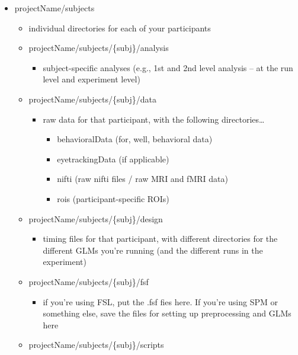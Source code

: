 \documentclass[]{book}
\providecommand{\tightlist}{%
  \setlength{\itemsep}{0pt}\setlength{\parskip}{0pt}}
\begin{document}
\begin{itemize}
\tightlist
\item
  projectName/subjects

  \begin{itemize}
  \tightlist
  \item
    individual directories for each of your participants
  \item
    projectName/subjects/\{subj\}/analysis

    \begin{itemize}
    \tightlist
    \item
      subject-specific analyses (e.g., 1st and 2nd level analysis -- at the run level and experiment level)
    \end{itemize}
  \item
    projectName/subjects/\{subj\}/data

    \begin{itemize}
    \tightlist
    \item
      raw data for that participant, with the following directories\ldots{}

      \begin{itemize}
      \tightlist
      \item
        behavioralData (for, well, behavioral data)
      \item
        eyetrackingData (if applicable)
      \item
        nifti (raw nifti files / raw MRI and fMRI data)
      \item
        rois (participant-specific ROIs)
      \end{itemize}
    \end{itemize}
  \item
    projectName/subjects/\{subj\}/design

    \begin{itemize}
    \tightlist
    \item
      timing files for that participant, with different directories for the different GLMs you're running (and the different runs in the experiment)
    \end{itemize}
  \item
    projectName/subjects/\{subj\}/fsf

    \begin{itemize}
    \tightlist
    \item
      if you're using FSL, put the .fsf fies here. If you're using SPM or something else, save the files for setting up preprocessing and GLMs here
    \end{itemize}
  \item
    projectName/subjects/\{subj\}/scripts


\end{itemize}
\end{itemize}
\end{document}

